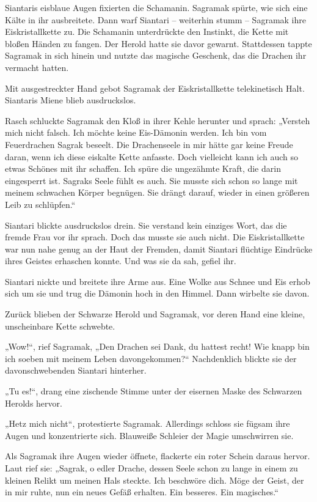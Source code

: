 Siantaris eisblaue Augen fixierten die Schamanin. Sagramak spürte, wie sich eine Kälte in ihr ausbreitete. Dann warf Siantari – weiterhin stumm – Sagramak ihre Eiskristallkette zu. Die Schamanin unterdrückte den Instinkt, die Kette mit bloßen Händen zu fangen. Der Herold hatte sie davor gewarnt. Stattdessen tappte Sagramak in sich hinein und nutzte das magische Geschenk, das die Drachen ihr vermacht hatten.

Mit ausgestreckter Hand gebot Sagramak der Eiskristallkette telekinetisch Halt. Siantaris Miene blieb ausdruckslos.

Rasch schluckte Sagramak den Kloß in ihrer Kehle herunter und sprach: „Versteh mich nicht falsch. Ich möchte keine Eis-Dämonin werden. Ich bin vom Feuerdrachen Sagrak beseelt. Die Drachenseele in mir hätte gar keine Freude daran, wenn ich diese eiskalte Kette anfasste. Doch vielleicht kann ich auch so etwas Schönes mit ihr schaffen. Ich spüre die ungezähmte Kraft, die darin eingesperrt ist. Sagraks Seele fühlt es auch. Sie musste sich schon so lange mit meinem schwachen Körper begnügen. Sie drängt darauf, wieder in einen größeren Leib zu schlüpfen.“

Siantari blickte ausdruckslos drein. Sie verstand kein einziges Wort, das die fremde Frau vor ihr sprach. Doch das musste sie auch nicht. Die Eiskristallkette war nun nahe genug an der Haut der Fremden, damit Siantari flüchtige Eindrücke ihres Geistes erhaschen konnte. Und was sie da sah, gefiel ihr.

Siantari nickte und breitete ihre Arme aus. Eine Wolke aus Schnee und Eis erhob sich um sie und trug die Dämonin hoch in den Himmel. Dann wirbelte sie davon.

Zurück blieben der Schwarze Herold und Sagramak, vor deren Hand eine kleine, unscheinbare Kette schwebte.

„Wow!“, rief Sagramak, „Den Drachen sei Dank, du hattest recht! Wie knapp bin ich soeben mit meinem Leben davongekommen?“ Nachdenklich blickte sie der davonschwebenden Siantari hinterher.

„Tu es!“, drang eine zischende Stimme unter der eisernen Maske des Schwarzen Herolds hervor.

„Hetz mich nicht“, protestierte Sagramak. Allerdings schloss sie fügsam ihre Augen und konzentrierte sich. Blauweiße Schleier der Magie umschwirren sie.

Als Sagramak ihre Augen wieder öffnete, flackerte ein roter Schein daraus hervor. Laut rief sie: „Sagrak, o edler Drache, dessen Seele schon zu lange in einem zu kleinen Relikt um meinen Hals steckte. Ich beschwöre dich. Möge der Geist, der in mir ruhte, nun ein neues Gefäß erhalten. Ein besseres. Ein magisches.“

